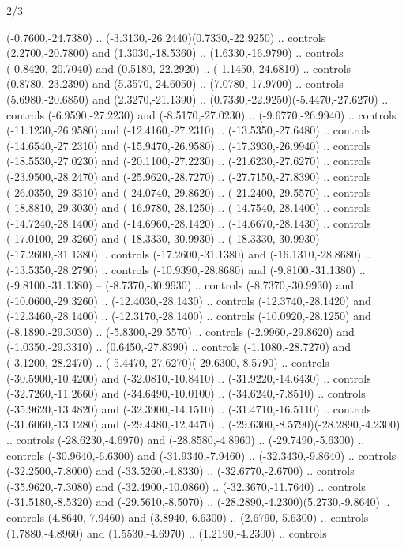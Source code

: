 \begin{flagdescription}{2/3}
\begin{scope}[xshift=0.5\flaglength,yshift=0.5\flagwidth,scale=\flagwidth/480]
\begin{scope}[y=0.80pt, x=0.80pt, yscale=-1,shift={(-450,-300)}]
  (-0.7600,-24.7380) .. (-3.3130,-26.2440)(0.7330,-22.9250) .. controls
  (2.2700,-20.7800) and (1.3030,-18.5360) .. (1.6330,-16.9790) .. controls
  (-0.8420,-20.7040) and (0.5180,-22.2920) .. (-1.1450,-24.6810) .. controls
  (0.8780,-23.2390) and (5.3570,-24.6050) .. (7.0780,-17.9700) .. controls
  (5.6980,-20.6850) and (2.3270,-21.1390) .. (0.7330,-22.9250)(-5.4470,-27.6270)
  .. controls (-6.9590,-27.2230) and (-8.5170,-27.0230) .. (-9.6770,-26.9940) ..
  controls (-11.1230,-26.9580) and (-12.4160,-27.2310) .. (-13.5350,-27.6480) ..
  controls (-14.6540,-27.2310) and (-15.9470,-26.9580) .. (-17.3930,-26.9940) ..
  controls (-18.5530,-27.0230) and (-20.1100,-27.2230) .. (-21.6230,-27.6270) ..
  controls (-23.9500,-28.2470) and (-25.9620,-28.7270) .. (-27.7150,-27.8390) ..
  controls (-26.0350,-29.3310) and (-24.0740,-29.8620) .. (-21.2400,-29.5570) ..
  controls (-18.8810,-29.3030) and (-16.9780,-28.1250) .. (-14.7540,-28.1400) ..
  controls (-14.7240,-28.1400) and (-14.6960,-28.1420) .. (-14.6670,-28.1430) ..
  controls (-17.0100,-29.3260) and (-18.3330,-30.9930) .. (-18.3330,-30.9930) --
  (-17.2600,-31.1380) .. controls (-17.2600,-31.1380) and (-16.1310,-28.8680) ..
  (-13.5350,-28.2790) .. controls (-10.9390,-28.8680) and (-9.8100,-31.1380) ..
  (-9.8100,-31.1380) -- (-8.7370,-30.9930) .. controls (-8.7370,-30.9930) and
  (-10.0600,-29.3260) .. (-12.4030,-28.1430) .. controls (-12.3740,-28.1420) and
  (-12.3460,-28.1400) .. (-12.3170,-28.1400) .. controls (-10.0920,-28.1250) and
  (-8.1890,-29.3030) .. (-5.8300,-29.5570) .. controls (-2.9960,-29.8620) and
  (-1.0350,-29.3310) .. (0.6450,-27.8390) .. controls (-1.1080,-28.7270) and
  (-3.1200,-28.2470) .. (-5.4470,-27.6270)(-29.6300,-8.5790) .. controls
  (-30.5900,-10.4200) and (-32.0810,-10.8410) .. (-31.9220,-14.6430) .. controls
  (-32.7260,-11.2660) and (-34.6490,-10.0100) .. (-34.6240,-7.8510) .. controls
  (-35.9620,-13.4820) and (-32.3900,-14.1510) .. (-31.4710,-16.5110) .. controls
  (-31.6060,-13.1280) and (-29.4480,-12.4470) ..
  (-29.6300,-8.5790)(-28.2890,-4.2300) .. controls (-28.6230,-4.6970) and
  (-28.8580,-4.8960) .. (-29.7490,-5.6300) .. controls (-30.9640,-6.6300) and
  (-31.9340,-7.9460) .. (-32.3430,-9.8640) .. controls (-32.2500,-7.8000) and
  (-33.5260,-4.8330) .. (-32.6770,-2.6700) .. controls (-35.9620,-7.3080) and
  (-32.4900,-10.0860) .. (-32.3670,-11.7640) .. controls (-31.5180,-8.5320) and
  (-29.5610,-8.5070) .. (-28.2890,-4.2300)(5.2730,-9.8640) .. controls
  (4.8640,-7.9460) and (3.8940,-6.6300) .. (2.6790,-5.6300) .. controls
  (1.7880,-4.8960) and (1.5530,-4.6970) .. (1.2190,-4.2300) .. controls

\end{scope}
\end{scope}
\end{flagdescription}
